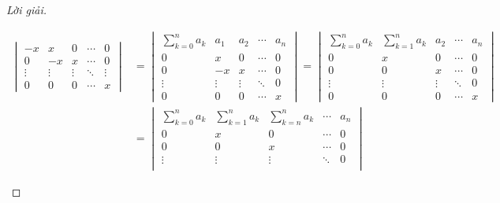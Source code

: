 \documentclass[class=nhvh-linear-algebra,crop=false]{standalone}
\begin{document}
\begin{proof}[Lời giải]
\begin{enumerate}[label = (\alph*)]
\begin{align*}
\begin{vmatrix}
                      -x     & x      & 0      & \cdots & 0      \\
                      0      & -x     & x      & \cdots & 0      \\
                      \vdots & \vdots & \vdots & \ddots & \vdots \\
                      0      & 0      & 0      & \cdots & x
                  \end{vmatrix}
                   & =
                  \begin{vmatrix}
                      \sum^{n}_{k=0}a_{k} & a_{1}  & a_{2}  & \cdots & a_{n} \\
                      0                   & x      & 0      & \cdots & 0     \\
                      0                   & -x     & x      & \cdots & 0     \\
                      \vdots              & \vdots & \vdots & \ddots & 0     \\
                      0                   & 0      & 0      & \cdots & x
                  \end{vmatrix}
                  =
                  \begin{vmatrix}
                      \sum^{n}_{k=0}a_{k} & \sum^{n}_{k=1}a_{k} & a_{2}  & \cdots & a_{n} \\
                      0                   & x                   & 0      & \cdots & 0     \\
                      0                   & 0                   & x      & \cdots & 0     \\
                      \vdots              & \vdots              & \vdots & \ddots & 0     \\
                      0                   & 0                   & 0      & \cdots & x
                  \end{vmatrix} \\
                   & =
                  \begin{vmatrix}
                      \sum^{n}_{k=0}a_{k} & \sum^{n}_{k=1}a_{k} & \sum^{n}_{k=n}a_{k} & \cdots & a_{n} \\
                      0                   & x                   & 0                   & \cdots & 0     \\
                      0                   & 0                   & x                   & \cdots & 0     \\
                      \vdots              & \vdots              & \vdots              & \ddots & 0     \\

\end{vmatrix}
\end{align*}
\end{enumerate}
\end{proof}
\end{document}
